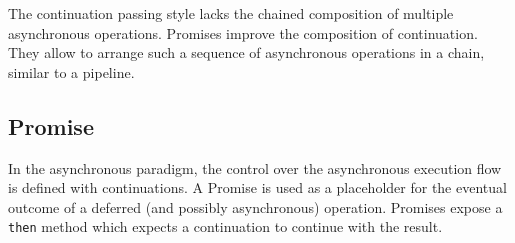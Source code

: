 The continuation passing style lacks the chained composition of multiple asynchronous operations.
Promises improve the composition of continuation.
They allow to arrange such a sequence of asynchronous operations in a chain, similar to a pipeline.


\subsection{Promise} \label{chapter4:event-loop:promise}



In the asynchronous paradigm, the control over the asynchronous execution flow is defined with continuations.
A Promise is used as a placeholder for the eventual outcome of a deferred (and possibly asynchronous) operation.
Promises expose a \texttt{then} method which expects a continuation to continue with the result. %

